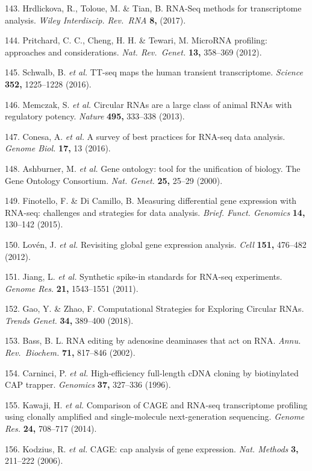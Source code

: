 \documentclass[11pt,twoside]{MPIthesis}
\theoremstyle{definition}
\theoremstyle{definition}
\theoremstyle{definition}
\theoremstyle{remark}
\begin{document}
143. Hrdlickova, R., Toloue, M. \& Tian, B. RNA-Seq methods for
transcriptome analysis. \emph{Wiley Interdiscip. Rev.~RNA} \textbf{8,}
(2017).

144. Pritchard, C. C., Cheng, H. H. \& Tewari, M. MicroRNA profiling:
approaches and considerations. \emph{Nat. Rev.~Genet.} \textbf{13,}
358--369 (2012).

145. Schwalb, B. \emph{et al.} TT-seq maps the human transient
transcriptome. \emph{Science} \textbf{352,} 1225--1228 (2016).

146. Memczak, S. \emph{et al.} Circular RNAs are a large class of animal
RNAs with regulatory potency. \emph{Nature} \textbf{495,} 333--338
(2013).

147. Conesa, A. \emph{et al.} A survey of best practices for RNA-seq
data analysis. \emph{Genome Biol.} \textbf{17,} 13 (2016).

148. Ashburner, M. \emph{et al.} Gene ontology: tool for the unification
of biology. The Gene Ontology Consortium. \emph{Nat. Genet.}
\textbf{25,} 25--29 (2000).

149. Finotello, F. \& Di Camillo, B. Measuring differential gene
expression with RNA-seq: challenges and strategies for data analysis.
\emph{Brief. Funct. Genomics} \textbf{14,} 130--142 (2015).

150. Lovén, J. \emph{et al.} Revisiting global gene expression analysis.
\emph{Cell} \textbf{151,} 476--482 (2012).

151. Jiang, L. \emph{et al.} Synthetic spike-in standards for RNA-seq
experiments. \emph{Genome Res.} \textbf{21,} 1543--1551 (2011).

152. Gao, Y. \& Zhao, F. Computational Strategies for Exploring Circular
RNAs. \emph{Trends Genet.} \textbf{34,} 389--400 (2018).

153. Bass, B. L. RNA editing by adenosine deaminases that act on RNA.
\emph{Annu. Rev.~Biochem.} \textbf{71,} 817--846 (2002).

154. Carninci, P. \emph{et al.} High-efficiency full-length cDNA cloning
by biotinylated CAP trapper. \emph{Genomics} \textbf{37,} 327--336
(1996).

155. Kawaji, H. \emph{et al.} Comparison of CAGE and RNA-seq
transcriptome profiling using clonally amplified and single-molecule
next-generation sequencing. \emph{Genome Res.} \textbf{24,} 708--717
(2014).

156. Kodzius, R. \emph{et al.} CAGE: cap analysis of gene expression.
\emph{Nat. Methods} \textbf{3,} 211--222 (2006).
\end{document}
